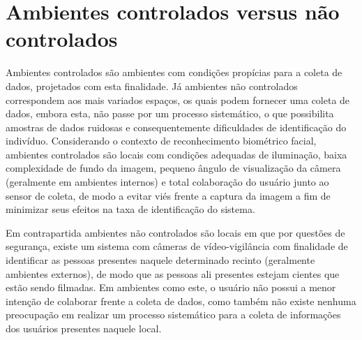 \section{Ambientes controlados versus não controlados}
\label{sec:amb. cont x n.cont}
Ambientes controlados são ambientes com condições propícias para a coleta de dados, projetados com esta finalidade. Já ambientes não controlados correspondem aos mais variados espaços, os quais podem fornecer uma coleta de dados, embora esta, não passe por um processo sistemático, o que possibilita amostras de dados ruidosas e consequentemente dificuldades de identificação do indivíduo. Considerando o contexto  de reconhecimento biométrico facial, ambientes controlados são locais com condições adequadas de iluminação, baixa complexidade de fundo da imagem, pequeno ângulo de visualização da câmera (geralmente em ambientes internos) e total colaboração do usuário junto ao sensor de coleta, de modo a evitar viés frente a captura da imagem a fim de minimizar seus efeitos na taxa de identificação do sistema. 

Em contrapartida ambientes não controlados são locais em que por questões de segurança, existe um sistema com câmeras de vídeo-vigilância com finalidade de identificar as pessoas presentes naquele determinado recinto (geralmente ambientes externos), de modo que as pessoas ali presentes estejam cientes que estão sendo filmadas. Em ambientes como este, o usuário não possui a menor intenção de colaborar frente a coleta de dados, como também não existe nenhuma preocupação em realizar um processo sistemático para a coleta de informações dos usuários presentes naquele local.